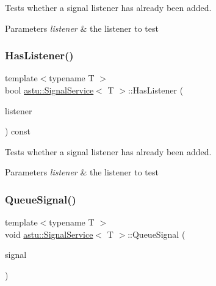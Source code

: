 Tests whether a signal listener has already been added.


\begin{DoxyParams}{Parameters}
{\em listener} & the listener to test \\
\hline
\end{DoxyParams}
\mbox{\label{classastu_1_1SignalService_aa1d411924b4e71ed3501215d5b6ffb7e}} 
\subsubsection{\texorpdfstring{Has\+Listener()}{HasListener()}\hspace{0.1cm}{\footnotesize\ttfamily [2/2]}}
{\footnotesize\ttfamily template$<$typename T $>$ \\
bool \hyperlink{classastu_1_1SignalService}{astu\+::\+Signal\+Service}$<$ T $>$\+::Has\+Listener (\begin{DoxyParamCaption}\item[{const \hyperlink{classastu_1_1ISignalListener}{I\+Signal\+Listener}$<$ T $>$ \&}]{listener }\end{DoxyParamCaption}) const\hspace{0.3cm}{\ttfamily [inline]}}

Tests whether a signal listener has already been added.


\begin{DoxyParams}{Parameters}
{\em listener} & the listener to test \\
\hline
\end{DoxyParams}
\mbox{\label{classastu_1_1SignalService_aa028a039b066a779af3834ffb3bdaa18}} 
\subsubsection{\texorpdfstring{Queue\+Signal()}{QueueSignal()}}
{\footnotesize\ttfamily template$<$typename T $>$ \\
void \hyperlink{classastu_1_1SignalService}{astu\+::\+Signal\+Service}$<$ T $>$\+::Queue\+Signal (\begin{DoxyParamCaption}\item[{const T \&}]{signal }\end{DoxyParamCaption})\hspace{0.3cm}{\ttfamily [inline]}}

